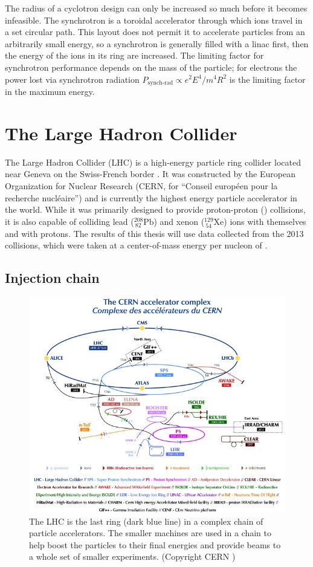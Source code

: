 The radius of a cyclotron design can only be increased so much before it becomes infeasible.
The synchrotron is a toroidal accelerator through which ions travel in a set circular path.
This layout does not permit it to accelerate particles from an arbitrarily small energy, so a synchrotron is generally filled with a linac first, then the energy of the ions in its ring are increased.
The limiting factor for synchrotron performance depends on the mass of the particle; for electrons the power lost via synchrotron radiation $P_\textrm{synch-rad} \propto e^2 E^4 / m^4 R^2 $ is the limiting factor in the maximum energy.


\section{The Large Hadron Collider}

The Large Hadron Collider (LHC) is a high-energy particle ring collider located near Geneva on the Swiss-French border \cite{LHCMachine}.
It was constructed by the European Organization for Nuclear Research (CERN, for ``Conseil européen pour la recherche nucléaire'') and is currently the highest energy particle accelerator in the world.
While it was primarily designed to provide proton-proton (\pp) collisions, it is also capable of colliding lead (${}^{208}_{\ 82}\textrm{Pb}$) and xenon (${}^{129}_{\ 54}\textrm{Xe}$) ions with themselves and with protons.
The results of this thesis will use data collected from the 2013 \pPb collisions, which were taken at a center-of-mass energy per nucleon of \pPbenergy.

\subsection{Injection chain}

\begin{figure}[t]
\includegraphics[width=0.8\linewidth]{CCC-v2018-print-v2.png}
\caption{The LHC is the last ring (dark blue line) in a complex chain of particle accelerators. The smaller machines are used in a chain to help boost the particles to their final energies and provide beams to a whole set of smaller experiments. (Copyright CERN \cite{Mobs:2636343})}
\label{fig:injection_chain}
\end{figure}


